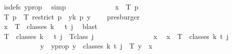 \begin{isabellebody}
\ is{\isacharunderscore}{\kern0pt}defs\ y{\isacharunderscore}{\kern0pt}prop\ \isamarkupfalse%
\ simp\isanewline
\ \ \ \ \ \ \ \ \ \ \isamarkupfalse%
\ \isamarkupfalse%
\ {\isachardoublequoteopen}x\ {\isacharequal}{\kern0pt}\ T\ p{\isachardoublequoteclose}\ \isanewline
\ \ \ \ \ \ \ \ \ \ \ \ \isamarkupfalse%
\ {\isacartoucheopen}T\ p\ {\isacharequal}{\kern0pt}\ T{\isacharprime}{\kern0pt}\ {\isacharparenleft}{\kern0pt}restrict\ p\ {\isacharbraceleft}{\kern0pt}{\isachardot}{\kern0pt}{\isachardot}{\kern0pt}{\isacharless}{\kern0pt}{}{\isacharbraceright}{\kern0pt}{\isacharparenright}{\kern0pt}\ {\isacharparenleft}{\kern0pt}{\isasymlambda}y{\isasymin}{\isacharbraceleft}{\kern0pt}{\isachardot}{\kern0pt}{\isachardot}{\kern0pt}{\isacharless}{\kern0pt}k{\isacharbraceright}{\kern0pt}{\isachardot}{\kern0pt}\ p\ {\isacharparenleft}{\kern0pt}y\ {\isacharplus}{\kern0pt}\ {}{\isacharparenright}{\kern0pt}{\isacharparenright}{\kern0pt}{\isacartoucheclose}\ \isamarkupfalse%
\ presburger\isanewline
\ \ \ \ \ \ \ \ \isamarkupfalse%
\isanewline
\ \ \ \ \ \ \ \ \isamarkupfalse%
\ \isamarkupfalse%
\ {\isachardoublequoteopen}x\ {\isasymin}\ T\ {\isacharbackquote}{\kern0pt}\ classes\ {\isacharparenleft}{\kern0pt}k\ {\isacharplus}{\kern0pt}\ {}{\isacharparenright}{\kern0pt}\ t\ j{\isachardoublequoteclose}\ \isamarkupfalse%
\ blast\isanewline
\ \ \ \ \ \ \isamarkupfalse%
\isanewline
\ \ \ \ \isamarkupfalse%
\isanewline
\ \ \ \ \ \ \isamarkupfalse%
\ {\isachardoublequoteopen}T\ {\isacharbackquote}{\kern0pt}\ classes\ {\isacharparenleft}{\kern0pt}k\ {\isacharplus}{\kern0pt}\ {}{\isacharparenright}{\kern0pt}\ t\ j\ {\isasymsubseteq}\ T{\isacharunderscore}{\kern0pt}class\ j{\isachardoublequoteclose}\isanewline
\ \ \ \ \ \ \isamarkupfalse%
\isanewline
\ \ \ \ \ \ \ \ \isamarkupfalse%
\ x\ \isamarkupfalse%
\ {\isachardoublequoteopen}x\ {\isasymin}\ T\ {\isacharbackquote}{\kern0pt}\ classes\ {\isacharparenleft}{\kern0pt}k{\isacharplus}{\kern0pt}{}{\isacharparenright}{\kern0pt}\ t\ j{\isachardoublequoteclose}\isanewline
\ \ \ \ \ \ \ \ \isamarkupfalse%
\ \isamarkupfalse%
\ y\ \ y{\isacharunderscore}{\kern0pt}prop{\isacharcolon}{\kern0pt}\ {\isachardoublequoteopen}y\ {\isasymin}\ classes\ {\isacharparenleft}{\kern0pt}k{\isacharplus}{\kern0pt}{}{\isacharparenright}{\kern0pt}\ t\ j\ {\isasymand}\ T\ y\ {\isacharequal}{\kern0pt}\ x{\isachardoublequoteclose}\ \isamarkupfalse%

\end{isabellebody}

